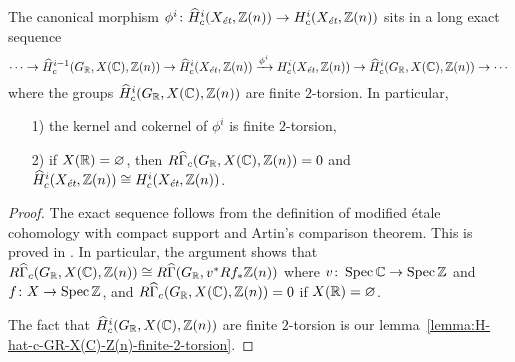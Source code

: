 \documentclass{article}
\numberwithin{equation}{section}
\begin{document}
\begin{lemma}
  \label{lemma:morphism-hat-Hc(Xet,Z(n))->Hc(Xet,Z(n))}
  The canonical morphism
  $\phi^i\colon \widehat{H}^i_c (X_\et, \ZZ (n)) \to H^i_c (X_\et, \ZZ (n))$
  sits in a long exact sequence
  \[ \cdots \to \widehat{H}^{i-1}_c (G_\RR, X (\CC), \ZZ (n)) \to
  \widehat{H}_c^i (X_\et, \ZZ(n)) \xrightarrow{\phi^i}
  H_c^i (X_\et, \ZZ(n)) \to
  \widehat{H}^i_c (G_\RR, X (\CC), \ZZ (n)) \to \cdots \]
  where the groups $\widehat{H}^i_c (G_\RR, X (\CC), \ZZ (n))$ are finite
  $2$-torsion. In particular,
  \begin{enumerate}
  \item[1)] the kernel and cokernel of $\phi^i$ is finite $2$-torsion,

  \item[2)] if $X (\RR) = \emptyset$, then
    $R\widehat{\Gamma}_c (G_\RR, X (\CC), \ZZ (n)) = 0$ and
    $\widehat{H}^i_c (X_\et, \ZZ (n)) \cong H^i_c (X_\et, \ZZ (n))$.
  \end{enumerate}

  \begin{proof}
    The exact sequence follows from the definition of modified étale cohomology
    with compact support and Artin's comparison theorem. This is proved in
    \cite[Lemma~6.14]{Flach-Morin-2018}. In particular, the argument shows that
    $R\widehat{\Gamma}_c (G_\RR, X (\CC), \ZZ (n)) \cong
    R\widehat{\Gamma} (G_\RR, v^* Rf_* \ZZ(n))$ where
    $v\colon \Spec \CC \to \Spec \ZZ$ and $f\colon X\to \Spec \ZZ$,
    and $R\widehat{\Gamma}_c (G_\RR, X (\CC), \ZZ (n)) = 0$ if
    $X (\RR) = \emptyset$.

    The fact that $\widehat{H}^i_c (G_\RR, X (\CC), \ZZ (n))$ are finite
    $2$-torsion is our lemma~\ref{lemma:H-hat-c-GR-X(C)-Z(n)-finite-2-torsion}.
  \end{proof}
\end{lemma}
\end{document}
